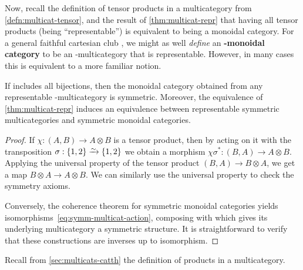 \documentclass{book}
\let\tensor\otimes
\begin{document}
Now, recall the definition of tensor products in a multicategory from \cref{defn:multicat-tensor}, and the result of \cref{thm:multicat-repr} that having all tensor products (being ``representable'') is equivalent to being a monoidal category.
For a general faithful cartesian club \fS, we might as well \emph{define} an \textbf{\fS-monoidal category} to be an \fS-multicategory that is representable.
However, in many cases this is equivalent to a more familiar notion.

\begin{thm}\label{thm:symm-multicat-repr}
  If \fS includes all bijections, then the monoidal category obtained from any representable \fS-multicategory is symmetric.
  Moreover, the equivalence of \cref{thm:multicat-repr} induces an equivalence between representable symmetric multicategories and symmetric monoidal categories.
\end{thm}
\begin{proof}
  If $\chi : (A,B) \to A\tensor B$ is a tensor product, then by acting on it with the transposition $\sigma : \{1,2\} \toiso \{1,2\}$ we obtain a morphism $\chi\sigma^* : (B,A) \to A\tensor B$.
  Applying the universal property of the tensor product $(B,A) \to B\tensor A$, we get a map $B\tensor A \to A\tensor B$.
  We can similarly use the universal property to check the symmetry axioms.

  Conversely, the coherence theorem for symmetric monoidal categories yields isomorphisms~\eqref{eq:symm-multicat-action}, composing with which gives its underlying multicategory a symmetric structure.
  It is straightforward to verify that these constructions are inverses up to isomorphism.
\end{proof}

Recall from \cref{sec:multicats-catth} the definition of products in a multicategory.
\end{document}
